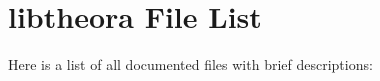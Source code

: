 \section{libtheora File List}
Here is a list of all documented files with brief descriptions:\begin{CompactList}
\item{}
\end{CompactList}
